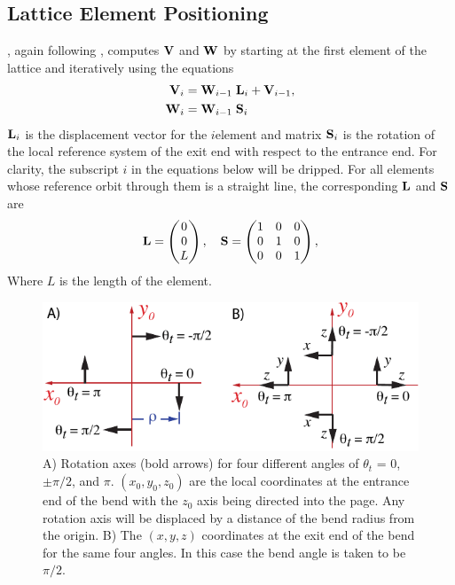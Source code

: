 \subsection{Lattice Element Positioning}
\label{s:ele.pos}

\bmad, again following \mad, computes ${\bf V}$ and ${\bf W}$ by starting
at the first element of the lattice and iteratively using the
equations
\begin{align}
  {\bf V}_i &= {\bf W}_{i-1} \; {\bf L}_i + {\bf V}_{i-1}, 
    \label{vwlv} \\
  {\bf W}_i &= {\bf W}_{i-1} \; {\bf S}_i
    \label{wws}
\end{align}
${\bf L}_i$ is the displacement vector for the $i$\Th element and matrix
${\bf S}_i$ is the rotation of the local reference system of the exit
end with respect to the entrance end. For clarity, the subscript $i$ in 
the equations below will be dripped. For all elements whose
reference orbit through them is a straight line, the corresponding
${\bf L}$ and ${\bf S}$ are
\begin{equation}
  {\bf L} = 
  \begin{pmatrix}
      0 \\ 0 \\ L
  \end{pmatrix},
  \quad
  {\bf S} = 
  \begin{pmatrix}
      1 & 0 & 0 \\ 
      0 & 1 & 0 \\
      0 & 0 & 1
  \end{pmatrix},
  \label{l00l}
\end{equation}
Where $L$ is the length of the element. 


\begin{figure}
\centering \includegraphics{tilt-bend.pdf} 
\caption[Orientation of a Bend.] 
  {
A) Rotation axes (bold arrows) for four different  angles
of $\theta_t$ = 0, $\pm \pi/2$, and $\pi$. $(x_0, y_0, z_0)$ are the
local coordinates at the entrance end of the bend with the $z_0$ axis
being directed into the page. Any rotation axis will be displaced by a
distance of the bend radius  from the origin. B) The $(x, y,
z)$ coordinates at the exit end of the bend for the same four
 angles. In this case the bend angle is taken to be
$\pi/2$.
  }
  \label{f:tilt.bend}
\end{figure}

